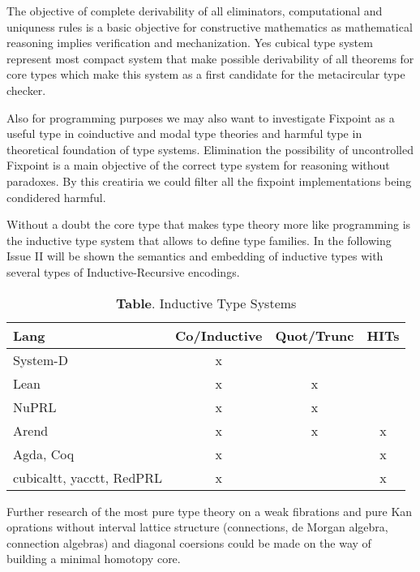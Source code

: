 \documentclass[twocolumn,10pt]{article}
\theoremstyle{definition}
\begin{document}
The objective of complete derivability of all eliminators, computational and uniquness rules
is a basic objective for constructive mathematics as mathematical reasoning implies verification
and mechanization. Yes cubical type system represent most compact system that make possible
derivability of all theorems for core types which make this system as a first candidate for
the metacircular type checker.

Also for programming purposes we may also want to investigate Fixpoint as a useful
type in coinductive and modal type theories and harmful type in theoretical foundation of type systems.
Elimination the possibility of uncontrolled Fixpoint is a main objective of the correct type system
for reasoning without paradoxes. By this creatiria we could filter all the fixpoint implementations being condidered harmful.

Without a doubt the core type that makes type theory more
like programming is the inductive type system that allows to
define type families. In the following Issue II will be shown
the semantics and embedding of inductive types with several types
of Inductive-Recursive encodings.

\begin{table}[!ht]
  \centering
  \caption*{\textbf{Table}. Inductive Type Systems}
  \begin{adjustbox}{width=\columnwidth,center}
  \begin{tabular}{lccc}
    \hline
       Lang & Co/Inductive & Quot/Trunc & HITs\\
    \hline
       System-D & x\\
       Lean & x & x\\
       NuPRL & x & x\\
       Arend & x & x & x\\
       Agda, Coq & x & & x\\
       cubicaltt, yacctt, RedPRL & x & & x\\
  \end{tabular}
  \end{adjustbox}
\end{table}

Further research of the most pure type theory on a weak fibrations and pure Kan
oprations without interval lattice structure (connections, de Morgan algebra, connection
algebras) and diagonal coersions could be made on the way of building a minimal homotopy core\cite{Cavallo19}.
\end{document}
